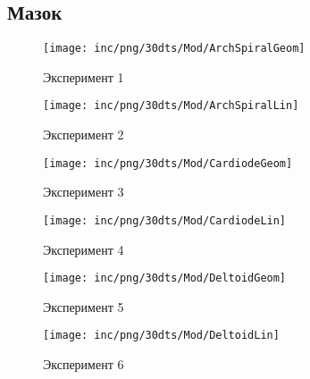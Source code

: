 \subsection{Мазок}
\begin{figure}  
	\begin{minipage}{0,5\textwidth}
		\texttt{[image: inc/png/30dts/Mod/ArchSpiralGeom]}
		\label{fig:app1}
		\caption{Эксперимент 1}
	\end{minipage}
	\begin{minipage}{0,5\textwidth}
		\texttt{[image: inc/png/30dts/Mod/ArchSpiralLin]}
		\label{fig:app2}
		\caption{Эксперимент 2}
	\end{minipage}
	
	\begin{minipage}{0,5\textwidth}
		\texttt{[image: inc/png/30dts/Mod/CardiodeGeom]}
		\label{fig:app3}
		\caption{Эксперимент 3}
	\end{minipage}
	\begin{minipage}{0,5\textwidth}
		\texttt{[image: inc/png/30dts/Mod/CardiodeLin]}
		\label{fig:app4}
		\caption{Эксперимент 4}
	\end{minipage}
	
	\begin{minipage}{0,5\textwidth}
		\texttt{[image: inc/png/30dts/Mod/DeltoidGeom]}
		\label{fig:app1}
		\caption{Эксперимент 5}
	\end{minipage}
	\begin{minipage}{0,5\textwidth}
		\texttt{[image: inc/png/30dts/Mod/DeltoidLin]}
		\label{fig:app2}
		\caption{Эксперимент 6}
	\end{minipage}
\end{figure}


